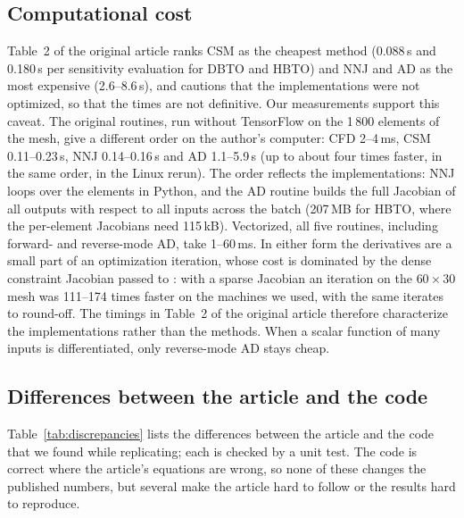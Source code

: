 \subsection{Computational cost}\label{sec:cost}
Table~2 of the original article ranks CSM as the cheapest method (0.088\,s and
0.180\,s per sensitivity evaluation for DBTO and HBTO) and NNJ and AD as the
most expensive (2.6--8.6\,s), and cautions that the implementations were not
optimized, so that the times are not definitive. Our measurements support this
caveat. The original routines, run without TensorFlow on
the 1\,800 elements of the mesh, give a different order on the author's
computer: CFD 2--4\,ms, CSM 0.11--0.23\,s, NNJ 0.14--0.16\,s and AD
1.1--5.9\,s (up to about four times faster, in the same order, in the Linux rerun). The order reflects the
implementations: NNJ loops over the elements in Python, and the AD routine
builds the full Jacobian of all outputs with respect to all inputs across the
batch (207\,MB for HBTO, where the per-element Jacobians need 115\,kB).
Vectorized, all five routines, including forward- and reverse-mode AD, take
1--60\,ms. In either form the derivatives are a small part of an optimization
iteration, whose cost is dominated by the dense constraint Jacobian passed to
: with a sparse Jacobian an iteration on the $60\times30$
mesh was 111--174 times faster on the machines we used, with the same iterates
to round-off. The timings in Table~2 of the original article therefore
characterize the implementations rather than the methods. When a scalar
function of many inputs is differentiated, only reverse-mode AD stays cheap.

\subsection{Differences between the article and the code}\label{sec:discrepancies}
Table~\ref{tab:discrepancies} lists the differences between the article and
the code that we found while replicating; each is checked by a unit test. The
code is correct where the article's equations are wrong, so none of these
changes the published numbers, but several make the article hard to follow or
the results hard to reproduce.

